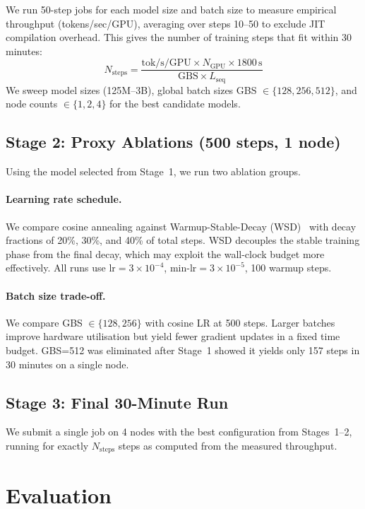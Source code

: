 \documentclass[10pt,twocolumn]{article}
\begin{document}
We run 50-step jobs for each model size and batch size to measure empirical
throughput (tokens/sec/GPU), averaging over steps 10--50 to exclude JIT
compilation overhead. This gives the number of training steps that fit within
30 minutes:
\[
  N_{\text{steps}} = \frac{\text{tok/s/GPU} \times N_{\text{GPU}} \times
  1800\,\text{s}}{\text{GBS} \times L_{\text{seq}}}
\]
We sweep model sizes (125M--3B), global batch sizes GBS $\in \{128,256,512\}$,
and node counts $\in \{1,2,4\}$ for the best candidate models.

\subsection{Stage 2: Proxy Ablations (500 steps, 1 node)}

Using the model selected from Stage~1, we run two ablation groups.

\paragraph{Learning rate schedule.}
We compare cosine annealing against Warmup-Stable-Decay
(WSD)~\cite{minicpm} with decay fractions of 20\%, 30\%, and 40\% of total
steps. WSD decouples the stable training phase from the final decay, which
may exploit the wall-clock budget more effectively. All runs use
$\text{lr}=3\!\times\!10^{-4}$, $\text{min-lr}=3\!\times\!10^{-5}$, 100
warmup steps.

\paragraph{Batch size trade-off.}
We compare GBS $\in \{128, 256\}$ with cosine LR at 500 steps. Larger
batches improve hardware utilisation but yield fewer gradient updates in a
fixed time budget. GBS=512 was eliminated after Stage~1 showed it yields
only 157 steps in 30 minutes on a single node.

\subsection{Stage 3: Final 30-Minute Run}

We submit a single job on 4 nodes with the best configuration from
Stages~1--2, running for exactly $N_{\text{steps}}$ steps as computed
from the measured throughput.

\section{Evaluation}
\end{document}
